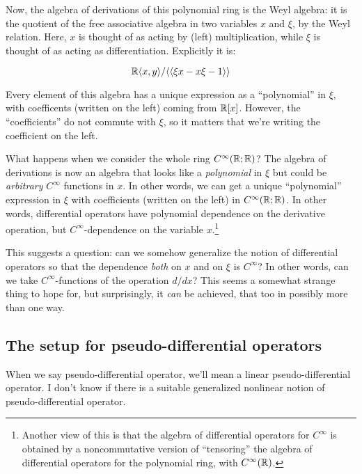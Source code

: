 \documentclass[a4paper]{amsart}
\begin{document}
Now, the algebra of derivations of this polynomial ring is the Weyl
algebra: it is the quotient of the free associative algebra in two
variables $x$ and $\xi$, by the Weyl relation. Here, $x$ is thought of
as acting by (left) multiplication, while $\xi$ is thought of as
acting as differentiation. Explicitly it is:

$$\mathbb{R} \langle x,y\rangle / \langle \langle \xi x - x \xi - 1 \rangle \rangle$$

Every element of this algebra has a unique expression as a
``polynomial'' in $\xi$, with coefficents (written on the left) coming
from $\mathbb{R}[x]$. However, the ``coefficients'' do not commute with $\xi$,
so it matters that we're writing the coefficient on the left.

What happens when we consider the whole ring $C^\infty(\mathbb{R};\mathbb{R})$? The
algebra of derivations is now an algebra that looks like a {\em
  polynomial} in $\xi$ but could be {\em arbitrary} $C^\infty$
functions in $x$. In other words, we can get a unique ``polynomial''
expression in $\xi$ with coefficients (written on the left) in
$C^\infty(\mathbb{R};\mathbb{R})$. In other words, differential operators have
polynomial dependence on the derivative operation, but
$C^\infty$-dependence on the variable $x$.\footnote{Another view of
  this is that the algebra of differential operators for $C^\infty$ is
  obtained by a noncommutative version of ``tensoring'' the algebra of
  differential operators for the polynomial ring, with
  $C^\infty(\mathbb{R})$.}

This suggests a question: can we somehow generalize the notion of
differential operators so that the dependence {\em both} on $x$ and on
$\xi$ is $C^\infty$? In other words, can we take $C^\infty$-functions
of the operation $d/dx$? This seems a somewhat strange thing to hope
for, but surprisingly, it {\em can} be achieved, that too in possibly
more than one way.

\subsection{The setup for pseudo-differential operators}

When we say pseudo-differential operator, we'll mean a
linear pseudo-differential operator. I don't know if
there is a suitable generalized nonlinear notion of
pseudo-differential operator.
\end{document}
